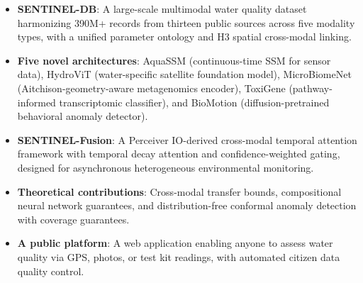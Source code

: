 \begin{itemize}
    \item \textbf{SENTINEL-DB}: A large-scale multimodal water quality dataset
    harmonizing 390M+ records from thirteen public sources across five modality
    types, with a unified parameter ontology and H3 spatial cross-modal linking.

    \item \textbf{Five novel architectures}: AquaSSM (continuous-time SSM for
    sensor data), HydroViT (water-specific satellite foundation model),
    MicroBiomeNet (Aitchison-geometry-aware metagenomics encoder), ToxiGene
    (pathway-informed transcriptomic classifier), and BioMotion
    (diffusion-pretrained behavioral anomaly detector).

    \item \textbf{SENTINEL-Fusion}: A Perceiver IO-derived cross-modal temporal
    attention framework with temporal decay attention and confidence-weighted
    gating, designed for asynchronous heterogeneous environmental monitoring.

    \item \textbf{Theoretical contributions}: Cross-modal transfer bounds,
    compositional neural network guarantees, and distribution-free conformal
    anomaly detection with coverage guarantees.

    \item \textbf{A public platform}: A web application enabling anyone to
    assess water quality via GPS, photos, or test kit readings, with
    automated citizen data quality control.
\end{itemize}
